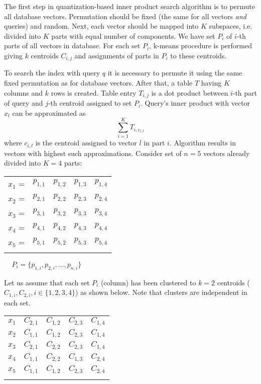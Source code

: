 The first step in quantization-based inner product search algorithm \cite{quantization} is to permute all database vectors.
Permutation should be fixed (the same for all vectors \textit{and} queries) and random.
Next, each vector should be mapped into $K$ subspaces, i.e. divided into $K$ parts with equal number of components.
We have set $P_i$ of $i$-th parts of all vectors in database.
For each set $P_i$, k-means procedure is performed giving $k$ centroids $C_{i,j}$ and assignments of parts in $P_i$ to these centroids.
\par
To search the index with query $q$ it is necessary to permute it using the same fixed permutation as for database vectors.
After that, a table $T$ having $K$ columns and $k$ rows is created.
Table entry $T_{i,j}$ is a dot product between $i$-th part of query and $j$-th centroid assigned to set $P_i$.
Query's inner product with vector $x_l$ can be approximated as $$\sum_{i=1}^{K} T_{i,c_{i,l}}$$
where $c_{i,l}$ is the centroid assigned to vector $l$ in part $i$. Algorithm results in vectors with highest such approximations.
Consider set of $n = 5$ vectors already divided into $K = 4$ parts:
\begin{center}
\renewcommand{\arraystretch}{1.2}
\begin{tabular}{c|c|c|c|c|}
\hhline{~----}
$x_1$ = & $p_{1,1}$ & $p_{1,2}$ & $p_{1,3}$ & $p_{1,4}$ \\
\hhline{~----}
$x_2$ = & $p_{2,1}$ & $p_{2,2}$ & $p_{2,3}$ & $p_{2,4}$ \\
\hhline{~----}
$x_3$ = & $p_{3,1}$ & $p_{3,2}$ & $p_{3,3}$ & $p_{3,4}$ \\
\hhline{~----}
$x_4$ = & $p_{4,1}$ & $p_{4,2}$ & $p_{4,3}$ & $p_{4,4}$ \\
\hhline{~----}
$x_5$ = & $p_{5,1}$ & $p_{5,2}$ & $p_{5,3}$ & $p_{5,4}$ \\
\hhline{~----}
\end{tabular}
$\ \ \ \ \ P_i = \{ p_{1,i}, p_{2,i}, \ldots, p_{n,i} \}$ \\
\end{center}

\smallskip

Let us assume that each set $P_i$ (column) has been clustered to $k=2$ centroids ($C_{1,i}, C_{2,i}, i \in \{1,2,3,4\}$) as shown below. Note that clusters are independent in each set.
\begin{center}
\renewcommand{\arraystretch}{1.2}
\begin{tabular}{c|c|c|c|c|}
\hhline{~----}
$x_1$ & $C_{2,1}$ & $C_{1,2}$ & $C_{2,3}$ & $C_{1,4}$ \\
\hhline{~----}
$x_2$ & $C_{1,1}$ & $C_{1,2}$ & $C_{2,3}$ & $C_{1,4}$ \\
\hhline{~----}
$x_3$ & $C_{2,1}$ & $C_{2,2}$ & $C_{2,3}$ & $C_{1,4}$ \\
\hhline{~----}
$x_4$ & $C_{1,1}$ & $C_{2,2}$ & $C_{1,3}$ & $C_{2,4}$ \\
\hhline{~----}
$x_5$ & $C_{1,1}$ & $C_{1,2}$ & $C_{2,3}$ & $C_{2,4}$ \\
\hhline{~----}
\end{tabular}
\end{center}


